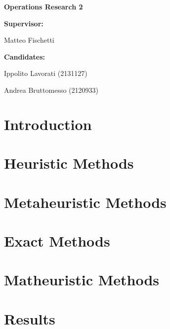 \documentclass[a4paper,12pt]{report}
\newcommand\blankpage{%
    \null
    \thispagestyle{empty}%
    \addtocounter{page}{-1}%
    \newpage}
\begin{document}
\begin{titlepage}
\begin{center}
\textbf{\large Operations Research 2}\\
\vfill

\raggedright\textbf{\large Supervisor:} \\
\raggedright\large Matteo Fischetti\\
\vfill
\raggedright\textbf{\large Candidates:} \\
\raggedright\large Ippolito Lavorati  (2131127)\\
\raggedright\large Andrea Bruttomesso (2120933)\\

\vfill
{}

\end{center}
\end{titlepage}

    

    
\begin{abstract}

\end{abstract}

\clearpage{\pagestyle{plain}\cleardoublepage}
\tableofcontents

\clearpage{\pagestyle{plain}\cleardoublepage}


\clearpage{\pagestyle{plain}\cleardoublepage}
\chapter{Introduction}

\chapter{Heuristic Methods}

\chapter{Metaheuristic Methods}

\chapter{Exact Methods}

\chapter{Matheuristic Methods}

\chapter{Results}


%

\printbibliography
\end{document}
